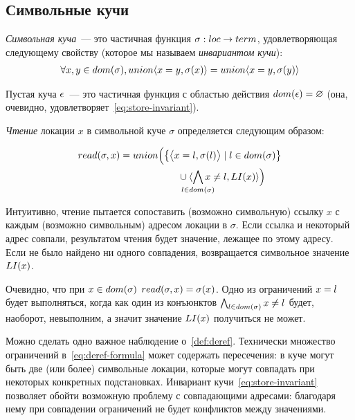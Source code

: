 \subsection{Символьные кучи}

\begin{defn}
\emph{Символьная куча}~--- это частичная функция $\sigma : loc \rightarrow term$, удовлетворяющая следующему свойству (которое мы называем \emph{инвариантом кучи}):
\begin{align}\label{eq:store-invariant}
	\forall x, y \in dom(\sigma), union{\langle x=y, \sigma(x)\rangle} = union{\langle x=y, \sigma(y)\rangle}
\end{align}
\end{defn}

\begin{defn}\label{def:empty-heap}
Пустая куча $\epsilon$~--- это частичная функция с областью действия $dom(\epsilon)=\varnothing$ (она, очевидно, удовлетворяет~\eqref{eq:store-invariant}).
\end{defn}

\begin{defn}\label{def:deref}
\emph{Чтение} локации $x$ в символьной куче $\sigma$ определяется следующим образом:
\begin{figure}[h]
\begin{align}\label{eq:deref-formula}
	\deref{\sigma}{x}&\notag=\rdbody{x}{\sigma}{\li{x}}
\end{align}
\end{figure}
\end{defn}

Интуитивно, чтение пытается сопоставить (возможно символьную) ссылку $x$ с каждым (возможно символьным) адресом локации в $\sigma$. Если ссылка и некоторый адрес совпали, результатом чтения будет значение, лежащее по этому адресу. Если не было найдено ни одного совпадения, возвращается символьное значение $LI(x)$.

Очевидно, что при $x\in dom(\sigma)$ $read(\sigma,x)=\sigma(x)$. Одно из ограничений $x=l$ будет выполняться, когда как один из конъюнктов $\bigwedge_{l\in dom(\sigma)}{x\neq l}$ будет, наоборот, невыполним, а значит значение $LI(x)$ получиться не может.

Можно сделать одно важное наблюдение о~\autoref{def:deref}. Технически множество ограничений в~\eqref{eq:deref-formula} может содержать пересечения: в куче могут быть две (или более) символьные локации, которые могут совпадать при некоторых конкретных подстановках. Инвариант кучи~\eqref{eq:store-invariant} позволяет обойти возможную проблему с совпадающими адресами: благодаря нему при совпадении ограничений не будет конфликтов между  значениями.


